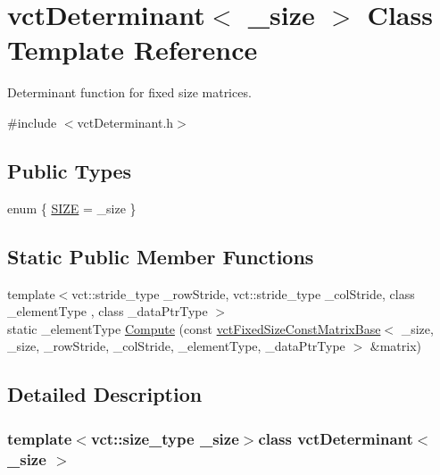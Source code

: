 \hypertarget{classvct_determinant}{\section{vct\-Determinant$<$ \-\_\-size $>$ Class Template Reference}
\label{classvct_determinant}
}


Determinant function for fixed size matrices.  




{\ttfamily \#include $<$vct\-Determinant.\-h$>$}

\subsection*{Public Types}
\begin{DoxyCompactItemize}
\item 
enum \{ \hyperlink{classvct_determinant_a0d11bb9b2c0545dde730acad696bb723af5935306ad86f093f0b4b547d12cf2c6}{S\-I\-Z\-E} = \-\_\-size
 \}
\end{DoxyCompactItemize}
\subsection*{Static Public Member Functions}
\begin{DoxyCompactItemize}
\item 
{\footnotesize template$<$vct\-::stride\-\_\-type \-\_\-row\-Stride, vct\-::stride\-\_\-type \-\_\-col\-Stride, class \-\_\-element\-Type , class \-\_\-data\-Ptr\-Type $>$ }\\static \-\_\-element\-Type \hyperlink{classvct_determinant_ae742f09944e4c45d2965af557b8d818e}{Compute} (const \hyperlink{classvct_fixed_size_const_matrix_base}{vct\-Fixed\-Size\-Const\-Matrix\-Base}$<$ \-\_\-size, \-\_\-size, \-\_\-row\-Stride, \-\_\-col\-Stride, \-\_\-element\-Type, \-\_\-data\-Ptr\-Type $>$ \&matrix)
\end{DoxyCompactItemize}


\subsection{Detailed Description}
\subsubsection*{template$<$vct\-::size\-\_\-type \-\_\-size$>$class vct\-Determinant$<$ \-\_\-size $>$}

